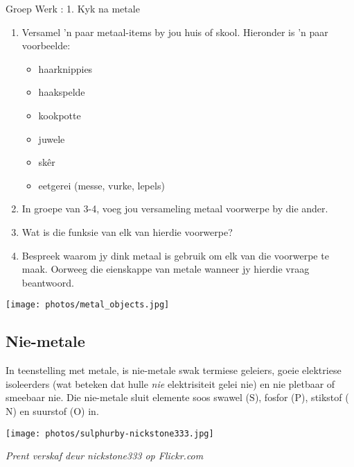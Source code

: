             \begin{activity}{Groep Werk : 1. Kyk na metale}{
            \nopagebreak
\begin{minipage}{0.5\textwidth}
        \label{m38708*id65869}\begin{enumerate}[noitemsep, label=\textbf{\arabic*}. ]
            \label{m38708*uid83}\item Versamel 'n paar metaal-items by jou huis of skool. Hieronder is  'n paar voorbeelde:
\label{m38708*id65885}\begin{itemize}[noitemsep]
            \label{m38708*uid84}\item haarknippies
\label{m38708*uid85}\item haakspelde
\label{m38708*uid86}\item kookpotte
\label{m38708*uid87}\item juwele
\label{m38708*uid88}\item sk\^er
\label{m38708*uid89}\item eetgerei (messe, vurke, lepels)
\end{itemize}
        \label{m38708*uid90}\item In groepe van 3-4, voeg jou versameling metaal voorwerpe by die ander.
\label{m38708*uid91}\item Wat is die funksie van elk van hierdie voorwerpe?
\label{m38708*uid92}\item Bespreek waarom jy dink metaal is gebruik om elk van die voorwerpe te maak. Oorweeg die eienskappe van metale wanneer jy hierdie vraag beantwoord. 
\end{enumerate}
\end{minipage}
\begin{minipage}{.5\textwidth}
\begin{center}
 \texttt{[image: photos/metal\_objects.jpg]}\par
\end{center}
\end{minipage}
}
\end{activity}
      \label{m38708*uid93}
            \subsection*{Nie-metale}
            \nopagebreak
\begin{minipage}{.5\textwidth}
        \label{m38708*id66021}In teenstelling met metale, is nie-metale swak termiese geleiers, goeie elektriese isoleerders (wat beteken dat hulle \textsl{nie} elektrisiteit gelei nie) en nie pletbaar of smeebaar nie. Die nie-metale sluit elemente soos swawel ($\text{S}$), fosfor ($\text{P}$), stikstof ($\text{N}$) en suurstof ($\text{O}$) in.\par 
\end{minipage}
\begin{minipage}{.5\textwidth}
\begin{center}
 \texttt{[image: photos/sulphurby-nickstone333.jpg]}\par
\textit{Prent verskaf deur nickstone333 op Flickr.com}
\end{center}
\end{minipage}
      \label{m38708*uid94}
